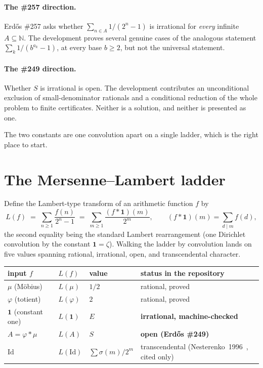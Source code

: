 \documentclass[11pt]{article}
\theoremstyle{definition}
\theoremstyle{remark}
\newcommand{\N}{\mathbb{N}}
\newcommand{\ph}{\varphi}
\begin{document}
\paragraph{The \#257 direction.} Erd\H{o}s \#257 asks whether
$\sum_{n\in A} 1/(2^n-1)$ is irrational for \emph{every} infinite $A\subseteq\N$.
The development proves several genuine cases of the analogous statement
$\sum_k 1/(b^{a_k}-1)$, at every base $b\ge2$, but not the universal statement.

\paragraph{The \#249 direction.} Whether $S$ is irrational is open. The
development contributes an unconditional exclusion of small-denominator rationals
and a conditional reduction of the whole problem to finite certificates. Neither
is a solution, and neither is presented as one.

The two constants are one convolution apart on a single ladder, which is the
right place to start.

\section{The Mersenne--Lambert ladder}\label{sec:ladder}

Define the Lambert-type transform of an arithmetic function $f$ by
\[
L(f)\;=\;\sum_{n\ge1}\frac{f(n)}{2^n-1}\;=\;\sum_{m\ge1}\frac{(f*\mathbf 1)(m)}{2^m},
\qquad (f*\mathbf 1)(m)=\sum_{d\mid m} f(d),
\]
the second equality being the standard Lambert rearrangement (one Dirichlet
convolution by the constant $\mathbf 1=\zeta$). Walking the ladder by convolution
lands on five values spanning rational, irrational, open, and transcendental
character.

\begin{center}
\begin{tabular}{@{}llll@{}}
\toprule
input $f$ & $L(f)$ & value & status in the repository\\
\midrule
$\mu$ (M\"obius) & $L(\mu)$ & $1/2$ & rational, proved\\
$\ph$ (totient) & $L(\ph)$ & $2$ & rational, proved\\
$\mathbf 1$ (constant one) & $L(\mathbf 1)$ & $E$ & \textbf{irrational, machine-checked}\\
$A=\ph*\mu$ & $L(A)$ & $S$ & \textbf{open (Erd\H{o}s \#249)}\\
$\mathrm{Id}$ & $L(\mathrm{Id})$ & $\sum\sigma(m)/2^m$ & transcendental (Nesterenko~1996~\cite{nesterenko}, cited only)\\
\bottomrule
\end{tabular}
\end{center}
\end{document}
